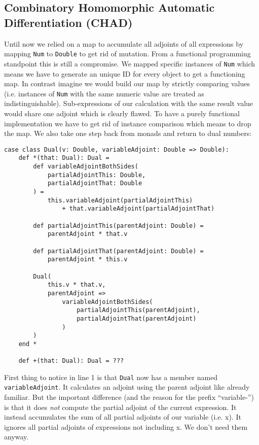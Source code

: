 \subsection{Combinatory Homomorphic Automatic Differentiation (CHAD)} \label{sec:chad}

Until now we relied on a map to accumulate all adjoints of all expressions by mapping \lstinline{Num} to \lstinline{Double} to get rid of mutation. From a functional programming standpoint this is still a compromise. We mapped specific instances of \lstinline{Num} which means we have to generate an unique ID for every object to get a functioning map. In contrast imagine we would build our map by strictly comparing values (i.e. instances of \lstinline{Num} with the same numeric value are treated as indistinguishable). Sub-expressions of our calculation with the same result value would share one adjoint which is clearly flawed. To have a purely functional implementation we have to get rid of instance comparison which means to drop the map. We also take one step back from monads and return to dual numbers:
\begin{lstlisting}
case class Dual(v: Double, variableAdjoint: Double => Double):
    def *(that: Dual): Dual =
        def variableAdjointBothSides(
            partialAdjointThis: Double, 
            partialAdjointThat: Double
        ) =
            this.variableAdjoint(partialAdjointThis) 
                + that.variableAdjoint(partialAdjointThat)

        def partialAdjointThis(parentAdjoint: Double) = 
            parentAdjoint * that.v
            
        def partialAdjointThat(parentAdjoint: Double) = 
            parentAdjoint * this.v

        Dual(
            this.v * that.v,
            parentAdjoint =>
                variableAdjointBothSides(
                    partialAdjointThis(parentAdjoint), 
                    partialAdjointThat(parentAdjoint)
                )
        )
    end *

    def +(that: Dual): Dual = ???
\end{lstlisting}
First thing to notice in line 1 is that \lstinline{Dual} now has a member named \lstinline{variableAdjoint}. It calculates an adjoint using the parent adjoint like already familiar. But the important difference (and the reason for the prefix ``variable-'') is that it does \emph{not} compute the partial adjoint of the current expression. It instead accumulates the sum of all partial adjoints of our variable (i.e. x). It ignores all partial adjoints of expressions not including x. We don't need them anyway. 


